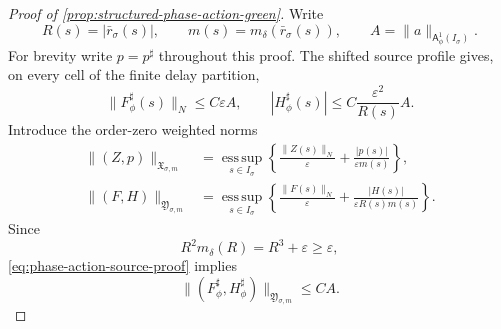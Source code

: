 \begin{proof}[Proof of
\cref{prop:structured-phase-action-green}]
Write
\[
 R(s)=|\bar r_\sigma(s)|,\qquad
 m(s)=m_\delta(\bar r_\sigma(s)),\qquad
 A=\|a\|_{\mathsf A_\phi^1(I_\sigma)}.
\]
For brevity write \(p=p^\sharp\) throughout this proof.
The shifted source profile gives, on every cell of the finite delay
partition,
\begin{equation}
 \|F_\phi^\sharp(s)\|_N\le C\varepsilon A,
 \qquad
 |H_\phi^\sharp(s)|\le C\frac{\varepsilon^2}{R(s)}A.
                                                        \label{eq:phase-action-source-proof}
\end{equation}
Introduce the order-zero weighted norms
\begin{align*}
 \|(Z,p)\|_{\mathfrak X_{\sigma,m}}
 &=\operatorname*{ess\,sup}_{s\in I_\sigma}
   \left\{\frac{\|Z(s)\|_N}{\varepsilon}
          +\frac{|p(s)|}{\varepsilon m(s)}\right\},\\
 \|(F,H)\|_{\mathfrak Y_{\sigma,m}}
 &=\operatorname*{ess\,sup}_{s\in I_\sigma}
   \left\{\frac{\|F(s)\|_N}{\varepsilon}
          +\frac{|H(s)|}{\varepsilon R(s)m(s)}\right\}.
\end{align*}
Since
\begin{equation}
 R^2m_\delta(R)=R^3+\varepsilon\ge\varepsilon,       \label{eq:phase-action-weight-root}
\end{equation}
\cref{eq:phase-action-source-proof} implies
\begin{equation}
 \|(F_\phi^\sharp,H_\phi^\sharp)\|_{
          \mathfrak Y_{\sigma,m}}\le CA.             \label{eq:phase-action-source-norm}
\end{equation}


\end{proof}
